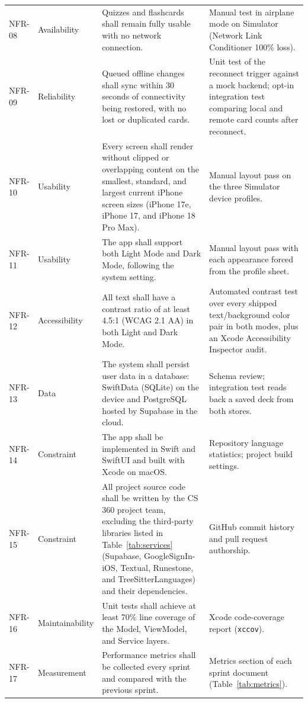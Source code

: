 \documentclass[12pt,letterpaper]{article}
\begin{document}
\begin{xltabular}{\textwidth}{@{}l L{2.1cm} Y L{4.3cm}@{}}
NFR-08 & Availability & Quizzes and flashcards shall remain fully usable with no network connection. & Manual test in airplane mode on Simulator (Network Link Conditioner 100\% loss). \\
NFR-09 & Reliability & Queued offline changes shall sync within 30 seconds of connectivity being restored, with no lost or duplicated cards. & Unit test of the reconnect trigger against a mock backend; opt-in integration test comparing local and remote card counts after reconnect. \\
NFR-10 & Usability & Every screen shall render without clipped or overlapping content on the smallest, standard, and largest current iPhone screen sizes (iPhone 17e, iPhone 17, and iPhone 18 Pro Max). & Manual layout pass on the three Simulator device profiles. \\
NFR-11 & Usability & The app shall support both Light Mode and Dark Mode, following the system setting. & Manual layout pass with each appearance forced from the profile sheet. \\
NFR-12 & Accessibility & All text shall have a contrast ratio of at least 4.5:1 (WCAG 2.1 AA) in both Light and Dark Mode. & Automated contrast test over every shipped text/background color pair in both modes, plus an Xcode Accessibility Inspector audit. \\
NFR-13 & Data & The system shall persist user data in a database: SwiftData (SQLite) on the device and PostgreSQL hosted by Supabase in the cloud. & Schema review; integration test reads back a saved deck from both stores. \\
NFR-14 & Constraint & The app shall be implemented in Swift and SwiftUI and built with Xcode on macOS. & Repository language statistics; project build settings. \\
NFR-15 & Constraint & All project source code shall be written by the CS 360 project team, excluding the third-party libraries listed in Table~\ref{tab:services} (Supabase, GoogleSignIn-iOS, Textual, Runestone, and TreeSitterLanguages) and their dependencies. & GitHub commit history and pull request authorship. \\
NFR-16 & Maintainability & Unit tests shall achieve at least 70\% line coverage of the Model, ViewModel, and Service layers. & Xcode code-coverage report (\texttt{xccov}). \\
NFR-17 & Measurement & Performance metrics shall be collected every sprint and compared with the previous sprint. & Metrics section of each sprint document (Table~\ref{tab:metrics}). \\

\end{xltabular}
\end{document}
